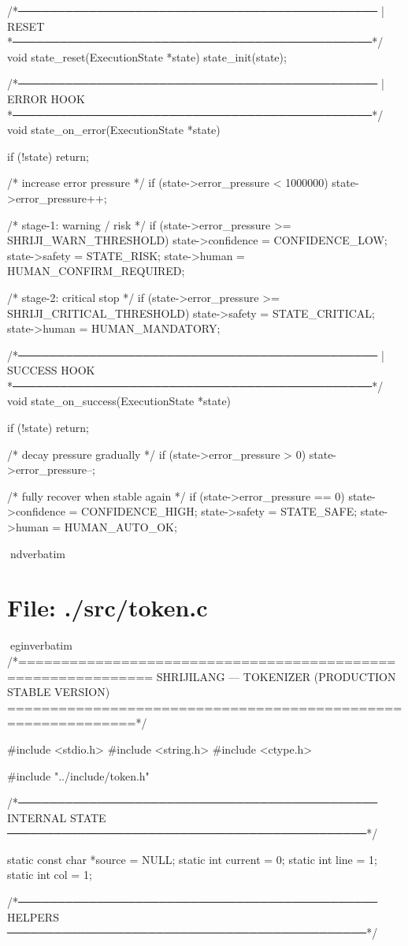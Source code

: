 \documentclass{article}
\begin{document}
/*──────────────────────────────────────────────
 | RESET
 *──────────────────────────────────────────────*/
void state_reset(ExecutionState *state)
{
    state_init(state);
}

/*──────────────────────────────────────────────
 | ERROR HOOK
 *──────────────────────────────────────────────*/
void state_on_error(ExecutionState *state)
{
    if (!state) return;

    /* increase error pressure */
    if (state->error_pressure < 1000000)
        state->error_pressure++;

    /* stage-1: warning / risk */
    if (state->error_pressure >= SHRIJI_WARN_THRESHOLD) {
        state->confidence = CONFIDENCE_LOW;
        state->safety = STATE_RISK;
        state->human = HUMAN_CONFIRM_REQUIRED;
    }

    /* stage-2: critical stop */
    if (state->error_pressure >= SHRIJI_CRITICAL_THRESHOLD) {
        state->safety = STATE_CRITICAL;
        state->human = HUMAN_MANDATORY;
    }
}

/*──────────────────────────────────────────────
 | SUCCESS HOOK
 *──────────────────────────────────────────────*/
void state_on_success(ExecutionState *state)
{
    if (!state) return;

    /* decay pressure gradually */
    if (state->error_pressure > 0)
        state->error_pressure--;

    /* fully recover when stable again */
    if (state->error_pressure == 0) {
        state->confidence = CONFIDENCE_HIGH;
        state->safety = STATE_SAFE;
        state->human = HUMAN_AUTO_OK;
    }
}
nd{verbatim}
\section*{File: ./src/token.c}
egin{verbatim}
/*=============================================================
  SHRIJILANG — TOKENIZER (PRODUCTION STABLE VERSION)
=============================================================*/

#include <stdio.h>
#include <string.h>
#include <ctype.h>

#include "../include/token.h"

/*──────────────────────────────────────────────
  INTERNAL STATE
──────────────────────────────────────────────*/

static const char *source = NULL;
static int current = 0;
static int line = 1;
static int col  = 1;

/*──────────────────────────────────────────────
  HELPERS
──────────────────────────────────────────────*/
\end{document}
